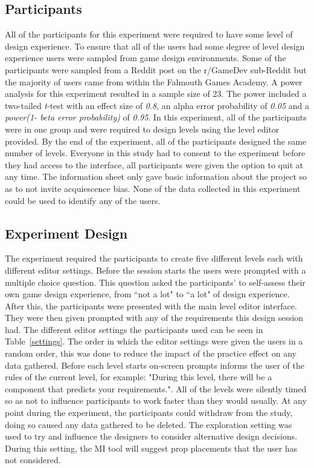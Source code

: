\documentclass[journal]{IEEEtran}
\begin{document}
\subsection{Participants}
All of the participants for this experiment were required to have some level of design experience. To ensure that all of the users had some degree of level design experience users were sampled from game design environments.  Some of the participants were sampled from a Reddit post on the r/GameDev sub-Reddit but the majority of users came from within the Falmouth Games Academy.
A power analysis for this experiment resulted in a sample size of 23. The power included a two-tailed \textit{t}-test with an effect size of \textit{0.8}, an alpha error probability of \textit{0.05} and a \textit{power(1- beta error probability)} of \textit{0.95}. In this experiment, all of the participants were in one group and were required to design levels using the level editor provided. By the end of the experiment, all of the participants designed the same number of levels. Everyone in this study had to consent to the experiment before they had access to the interface, all participants were given the option to quit at any time. The information sheet only gave basic information about the project so as to not invite acquiescence bias\cite{watson1992correcting}. None of the data collected in this experiment could be used to identify any of the users.

\subsection{Experiment Design}
The experiment required the participants to create five different levels each with different editor settings. Before the session starts the users were prompted with a multiple choice question. This question asked the participants' to self-assess their own game design experience, from ``not a lot" to ``a lot" of design experience. After this, the participants were presented with the main level editor interface. They were then given prompted with any of the requirements this design session had. The different editor settings the participants used can be seen in Table~\ref{settings}. The order in which the editor settings were given the users in a random order, this was done to reduce the impact of the practice effect on any data gathered. Before each level starts on-screen prompts informs the user of the rules of the current level, for example: "During this level, there will be a component that predicts your requirements.". All of the levels were silently timed so as not to influence participants to work faster than they would usually. At any point during the experiment, the participants could withdraw from the study, doing so caused any data gathered to be deleted. The exploration setting was used to try and influence the designers to consider alternative design decisions. During this setting, the MI tool will suggest prop placements that the user has not considered. 
\end{document}
